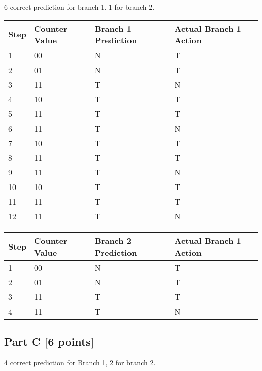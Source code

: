 \documentclass[11pt,leqno]{article}
\begin{document}
6 correct prediction for branch 1. 1 for branch 2.

\begin{tabular}{|l | l | l | l |}
  \hline
  Step  & Counter Value & Branch 1 Prediction   & Actual Branch 1 Action\\
  \hline
  1     & 00            & N                     & T\\
  \hline
  2     & 01            & N                     & T\\
  \hline
  3     & 11            & T                     & N\\
  \hline
  4     & 10            & T                     & T\\
  \hline
  5     & 11            & T                     & T\\
  \hline
  6     & 11            & T                     & N\\
  \hline
  7     & 10            & T                     & T\\
  \hline
  8     & 11            & T                     & T\\
  \hline
  9     & 11            & T                     & N\\
  \hline
  10    & 10            & T                     & T\\
  \hline
  11    & 11            & T                     & T\\
  \hline
  12    & 11            & T                     & N\\
  \hline
\end{tabular}

\begin{tabular}{|l | l | l | l |}
  \hline
  Step  & Counter Value & Branch 2 Prediction   & Actual Branch 1 Action\\
  \hline
  1     & 00            & N                     & T\\
  \hline
  2     & 01            & N                     & T\\
  \hline
  3     & 11            & T                     & T\\
  \hline
  4     & 11            & T                     & N\\
  \hline
\end{tabular}

\subsection*{Part C [6 points]}

4 correct prediction for Branch 1, 2 for branch 2.
\end{document}
